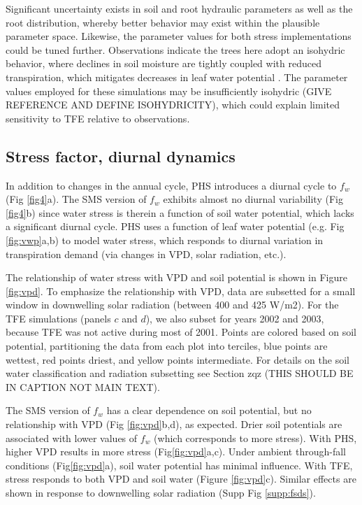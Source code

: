 \documentclass[draft,linenumbers]{agujournal}
\begin{document}
    Significant uncertainty exists in soil and root hydraulic parameters as well as the root distribution, whereby better behavior may exist within the plausible parameter space. Likewise, the parameter values for both stress implementations could be tuned further. Observations indicate the trees here adopt an isohydric behavior, where declines in soil moisture are tightly coupled with reduced transpiration, which mitigates decreases in leaf water potential \citep{fisher2006}. The parameter values employed for these simulations may be insufficiently isohydric (GIVE REFERENCE AND DEFINE ISOHYDRICITY), which could explain limited sensitivity to TFE relative to observations.
    


\subsection{Stress factor, diurnal dynamics}
    
    In addition to changes in the annual cycle, PHS introduces a diurnal cycle to $f_w$ (Fig \ref{fig4}a).  The SMS version of $f_w$ exhibits almost no diurnal variability (Fig \ref{fig4}b) since  water stress is therein a function of soil water potential, which lacks a significant diurnal cycle. PHS uses a function of leaf water potential (e.g. Fig \ref{fig:vwp}a,b) to model water stress, which responds to diurnal variation in transpiration demand (via changes in VPD, solar radiation, etc.).
    
    The relationship of water stress with VPD and soil potential is shown in Figure \ref{fig:vpd}. To emphasize the relationship with VPD, data are subsetted for a small window in downwelling solar radiation (between 400 and 425 W/m2). For the TFE simulations (panels $c$ and $d$), we also subset for years 2002 and 2003, because TFE was not active during most of 2001. Points are colored based on soil potential, partitioning the data from each plot into terciles, blue points are wettest, red points driest, and yellow points intermediate. For details on the soil water classification and radiation subsetting see Section zqz (THIS SHOULD BE IN CAPTION NOT MAIN TEXT).
    
    The SMS version of $f_w$ has a clear dependence on soil potential, but no relationship with VPD (Fig \ref{fig:vpd}b,d), as expected. Drier soil potentials are associated with lower values of $f_w$ (which corresponds to more stress). With PHS, higher VPD results in more stress (Fig\ref{fig:vpd}a,c). Under ambient through-fall conditions (Fig\ref{fig:vpd}a), soil water potential has minimal influence. With TFE, stress responds to both VPD and soil water (Figure \ref{fig:vpd}c). Similar effects are shown in response to downwelling solar radiation (Supp Fig \ref{supp:fsds}).
    
\end{document}
